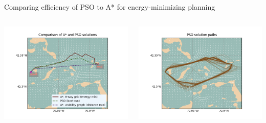 \documentclass[9pt,xcolor=table]{beamer}
\begin{document}
\begin{frame}{Comparing efficiency of PSO to A* for energy-minimizing planning}
    \begin{columns}
        \begin{column}{0.5\textwidth}
            \includegraphics[width=\textwidth,trim={0cm 0cm 0cm 0cm},clip]{img/paths_FP1_compare.png}
        \end{column}
        \begin{column}{0.5\textwidth}
            \includegraphics[width=\textwidth,trim={0cm 0cm 0cm 0cm},clip]{img/paths_FP1_many.png}
        \end{column}        
    \end{columns}
    \begin{columns}

\end{columns}
\end{frame}
\end{document}

